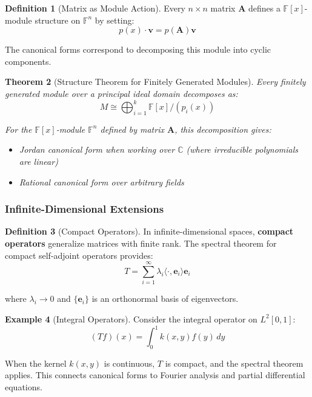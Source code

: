 \documentclass[12pt]{article}
\numberwithin{equation}{section}
\newcommand{\vect}[1]{\boldsymbol{#1}}   %
\newcommand{\mat}[1]{\mathbf{#1}}        %
\theoremstyle{plain}
\newtheorem{theorem}{Theorem}[section]
\theoremstyle{definition}
\newtheorem{definition}[theorem]{Definition}
\newtheorem{example}[theorem]{Example}
\theoremstyle{remark}
\begin{document}
\begin{definition}[Matrix as Module Action]
Every $n \times n$ matrix $\mat{A}$ defines a $\mathbb{F}[x]$-module structure on $\mathbb{F}^n$ by setting:
$$p(x) \cdot \vect{v} = p(\mat{A})\vect{v}$$

The canonical forms correspond to decomposing this module into cyclic components.
\end{definition}

\begin{theorem}[Structure Theorem for Finitely Generated Modules]
Every finitely generated module over a principal ideal domain decomposes as:
$$M \cong \bigoplus_{i=1}^k \mathbb{F}[x]/(p_i(x))$$

For the $\mathbb{F}[x]$-module $\mathbb{F}^n$ defined by matrix $\mat{A}$, this decomposition gives:
\begin{itemize}
\item Jordan canonical form when working over $\mathbb{C}$ (where irreducible polynomials are linear)
\item Rational canonical form over arbitrary fields
\end{itemize}
\end{theorem}

\subsubsection{Infinite-Dimensional Extensions}

\begin{definition}[Compact Operators]
In infinite-dimensional spaces, \textbf{compact operators} generalize matrices with finite rank. The spectral theorem for compact self-adjoint operators provides:
$$T = \sum_{i=1}^{\infty} \lambda_i \langle \cdot, \vect{e}_i \rangle \vect{e}_i$$

where $\lambda_i \to 0$ and $\{\vect{e}_i\}$ is an orthonormal basis of eigenvectors.
\end{definition}

\begin{example}[Integral Operators]
Consider the integral operator on $L^2[0,1]$:
$$(Tf)(x) = \int_0^1 k(x,y)f(y) \, dy$$

When the kernel $k(x,y)$ is continuous, $T$ is compact, and the spectral theorem applies. This connects canonical forms to Fourier analysis and partial differential equations.
\end{example}
\end{document}

